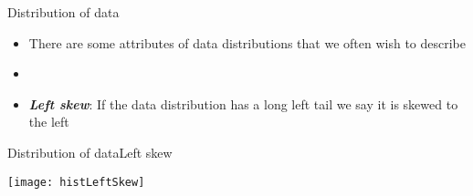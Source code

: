 \documentclass[xcolor=dvipsnames]{beamer}
\begin{document}
\begin{frame}{Distribution of data}
	\begin{itemize}
		\item There are some attributes of data distributions that we often wish to describe
		\item[]
		\item \textbf{\emph{Left skew}}: If the data distribution has a long left tail we say it is skewed to the left
	\end{itemize}
\end{frame}

\begin{frame}{Distribution of data}{Left skew}
	\begin{center}
		\texttt{[image: histLeftSkew]}
	\end{center}
\end{frame}
\end{document}
